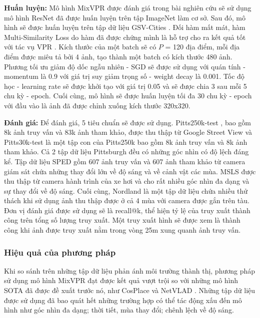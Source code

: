 \textbf{Huấn luyện:} Mô hình MixVPR được đánh giá trong bài nghiên cứu sẽ sử dụng mô hình ResNet \cite{he2016deep} đã được huấn luyện trên tập ImageNet \cite{krizhevsky2012imagenet} làm cơ sở. Sau đó, mô hình sẽ được huấn luyện trên tập dữ liệu GSV-Cities \cite{Ali_bey_2022}. Đối hàm mất mát, hàm Multi-Similarity Loss \cite{wang2019multi} do hàm đã được chứng mình là hỗ trợ cho ra kết quả tốt với tác vụ VPR \cite{Ali_bey_2022}. Kích thước của một batch sẽ có $P$ = 120 địa điểm, mỗi địa điểm được miêu tả bởi 4 ảnh, tạo thành một batch có kích thước 480 ảnh. Phương tối ưu giảm độ dốc ngẫu nhiên - SGD sẽ được sử dụng với quán tính - momentum là 0.9 với giá trị suy giảm trọng số - weight decay là 0.001. Tốc độ học - learning rate sẽ được khởi tạo với giá trị 0.05 và sẽ được chia 3 sau mỗi 5 chu kỳ - epoch. Cuối cùng, mô hình sẽ được huấn luyện tối đa 30 chu kỳ - epoch với đầu vào là ảnh đã được chỉnh xuống kích thước 320x320.

\textbf{Đánh giá:} Để đánh giá, 5 tiêu chuẩn sẽ được sử dụng. Pitts250k-test \cite{6618963}, bao gồm 8k ảnh truy vấn và 83k ảnh tham khảo, được thu thập từ Google Street View và Pitts30k-test \cite{6618963} là một tập con của Pitts250k bao gồm 8k ảnh truy vấn và 8k ảnh tham khảo. Cả 2 tập dữ liệu Pittsburgh đều có những góc nhìn có độ lệch đáng kể. Tập dữ liệu SPED \cite{zaffar2021vpr} gồm 607 ảnh truy vấn và 607 ảnh tham khảo từ camera giám sát chứa những thay đổi lớn về độ sáng và về cảnh vật các mùa. MSLS \cite{warburg2020mapillary} được thu thập từ camera hành trình của xe hơi và cho rất nhiều góc nhìn đa dạng và sự thay đổi về độ sáng. Cuối cùng, Nordland \cite{zaffar2021vpr} là một tập dữ liệu chứa nhiều thử thách khi sử dụng ảnh thu thập được ở cả 4 mùa với camera được gắn trên tàu. Đơn vị đánh giá được sử dụng sẽ là recall@k, thể hiện tỷ lệ của truy xuất thành công trên tổng số lượng truy xuất. Một truy xuất hình sẽ được xem là thành công khi ảnh được truy xuất nằm trong vòng 25m xung quanh ảnh truy vấn.

\subsubsection*{Hiệu quả của phương pháp}
Khi so sánh trên những tập dữ liệu phản ánh môi trường thành thị, phương pháp sử dụng mô hình MixVPR đạt được kết quả vượt trội so với những mô hình SOTA đã được đề xuất trước nó, như CosPlace \cite{berton2022rethinking} và NetVLAD \cite{arandjelović2016netvlad}. Những tập dữ liệu được sử dụng đã bao quát hết những trường hợp có thể tác động xấu đến mô hình như góc nhìn đa dạng; thời tiết, mùa thay đổi; chênh lệch về độ sáng.

